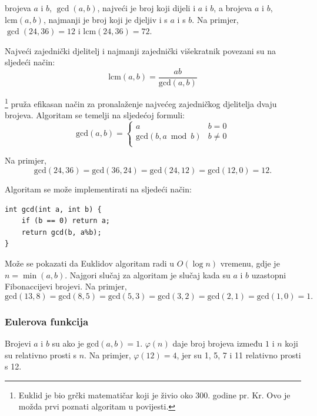 
brojeva $a$ i $b$, $\gcd(a,b)$,
najveći je broj koji dijeli i $a$ i $b$,
a 
brojeva $a$ i $b$, $\textrm{lcm}(a,b)$,
najmanji je broj koji je djeljiv
i s $a$ i s $b$.
Na primjer,
$\gcd(24,36)=12$ i
$\textrm{lcm}(24,36)=72$.

Najveći zajednički djelitelj i najmanji zajednički višekratnik
povezani su na sljedeći način:
\[\textrm{lcm}(a,b)=\frac{ab}{\textrm{gcd}(a,b)}\]

\footnote{Euklid je bio grčki matematičar koji
je živio oko 300. godine pr. Kr. Ovo je možda prvi poznati algoritam u povijesti.} pruža efikasan način
za pronalaženje najvećeg zajedničkog djelitelja dvaju brojeva.
Algoritam se temelji na sljedećoj formuli:
\begin{equation*}
    \textrm{gcd}(a,b) = \begin{cases}
               a        & b = 0\\
               \textrm{gcd}(b,a \bmod b) & b \neq 0\\
           \end{cases}
\end{equation*}

Na primjer,
\[\textrm{gcd}(24,36) = \textrm{gcd}(36,24)
= \textrm{gcd}(24,12) = \textrm{gcd}(12,0)=12.\]

Algoritam se može implementirati na sljedeći način:
\begin{lstlisting}
int gcd(int a, int b) {
    if (b == 0) return a;
    return gcd(b, a%b);
}
\end{lstlisting}

Može se pokazati da Euklidov algoritam radi
u $O(\log n)$ vremenu, gdje je $n=\min(a,b)$.
Najgori slučaj za algoritam je
slučaj kada su $a$ i $b$ uzastopni Fibonaccijevi brojevi.
Na primjer,
\[\textrm{gcd}(13,8)=\textrm{gcd}(8,5)
=\textrm{gcd}(5,3)=\textrm{gcd}(3,2)=\textrm{gcd}(2,1)=\textrm{gcd}(1,0)=1.\]

\subsubsection{Eulerova funkcija}


Brojevi $a$ i $b$ su 
ako je $\textrm{gcd}(a,b)=1$.
 $\varphi(n)$
daje broj brojeva između $1$ i $n$
koji su relativno prosti s $n$.
Na primjer, $\varphi(12)=4$,
jer su 1, 5, 7 i 11
relativno prosti s 12.


